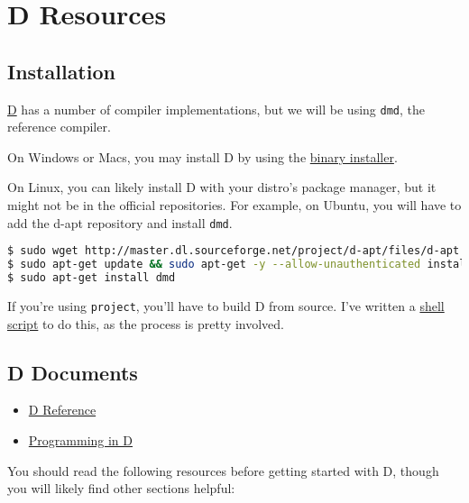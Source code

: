 \section{D Resources}\label{d-resources}

\subsection{Installation}\label{installation}

\href{http://dlang.org}{D} has a number of compiler implementations, but
we will be using \lstinline!dmd!, the reference compiler.

On Windows or Macs, you may install D by using the
\href{http://ftp.digitalmars.com/dinstaller.exe}{binary installer}.

On Linux, you can likely install D with your distro's package manager,
but it might not be in the official repositories. For example, on
Ubuntu, you will have to add the d-apt repository and install
\lstinline!dmd!.

\begin{lstlisting}[language=sh]
$ sudo wget http://master.dl.sourceforge.net/project/d-apt/files/d-apt.list -O /etc/apt/sources.list.d/d-apt.list
$ sudo apt-get update && sudo apt-get -y --allow-unauthenticated install --reinstall d-apt-keyring && sudo apt-get update
$ sudo apt-get install dmd
\end{lstlisting}

If you're using \lstinline!project!, you'll have to build D from source.
I've written a \href{./install_d.sh}{shell script} to do this, as the
process is pretty involved.

\subsection{D Documents}\label{d-documents}

\begin{itemize}
\itemsep1pt\parskip0pt
\item
  \href{http://dlang.org/intro.html}{D Reference}
\item
  \href{http://ddili.org/ders/d.en/index.html}{Programming in D}
\end{itemize}

You should read the following resources before getting started with D,
though you will likely find other sections helpful:

